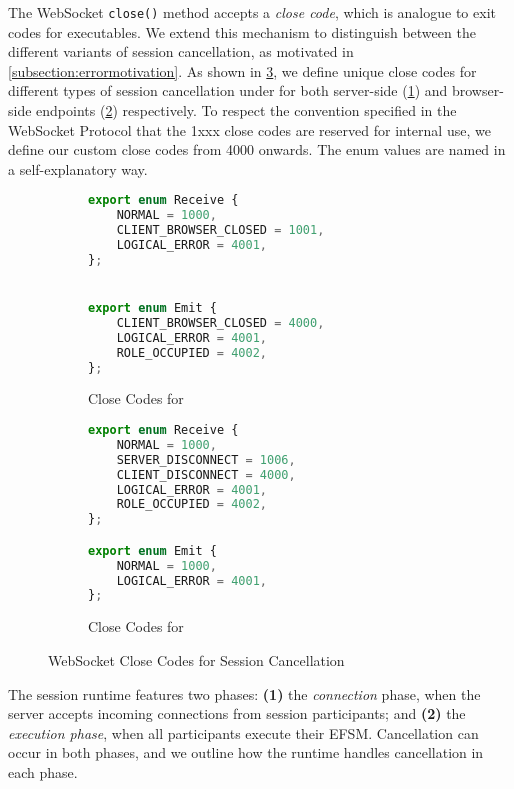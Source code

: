 The WebSocket \texttt{close()} method accepts a 
\textit{close code}, which is analogue to exit codes for
executables. We extend this mechanism to distinguish
between the different variants of session cancellation,
as motivated in \cref{subsection:errormotivation}.
As shown in \cref{fig:cancelenum},
we define unique close codes for different types
of session cancellation under 
for both server-side (\cref{subfig:cancelenumsvr})
and browser-side endpoints (\cref{subfig:cancelenumclient}) 
respectively. 
To respect the convention specified in the WebSocket Protocol
\cite{WebSocketRFC} that the 1xxx close codes 
are reserved for internal use,
we define our custom close codes from 4000 onwards.
The enum values are named in a self-explanatory way.

\begin{figure}[!h]
\begin{subfigure}{0.48\textwidth}
\begin{lstlisting}[language=javascript,tabsize=2]
export enum Receive {
	NORMAL = 1000,
	CLIENT_BROWSER_CLOSED = 1001,
	LOGICAL_ERROR = 4001,
};


export enum Emit {
	CLIENT_BROWSER_CLOSED = 4000,
	LOGICAL_ERROR = 4001,
	ROLE_OCCUPIED = 4002,
};
\end{lstlisting}
\caption{Close Codes for }
\label{subfig:cancelenumsvr}
\end{subfigure}
\hfill
\begin{subfigure}{0.48\textwidth}
\begin{lstlisting}[language=javascript,tabsize=2]
export enum Receive {
	NORMAL = 1000,
	SERVER_DISCONNECT = 1006,
	CLIENT_DISCONNECT = 4000,
	LOGICAL_ERROR = 4001,
	ROLE_OCCUPIED = 4002,
};

export enum Emit {
	NORMAL = 1000,
	LOGICAL_ERROR = 4001,
};
\end{lstlisting}
\caption{Close Codes for }
\label{subfig:cancelenumclient}
\end{subfigure}
\caption{WebSocket Close Codes for Session Cancellation}
\label{fig:cancelenum}
\end{figure}

The session runtime features two phases:
\textbf{(1)} the \textit{connection} phase, when the server
accepts incoming connections from session participants;
and \textbf{(2)} the \textit{execution phase}, when all
participants execute their EFSM.
Cancellation can occur in both phases, and we outline
how the runtime handles cancellation in each phase.

